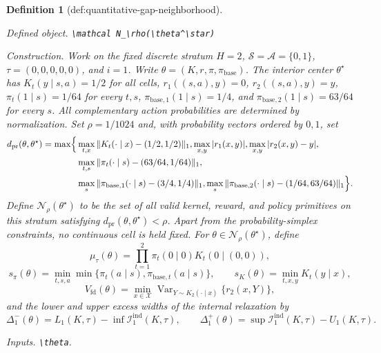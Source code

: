 \documentclass{article}
\newtheorem{definition}{Definition}
\begin{document}
\begin{definition}[def:quantitative-gap-neighborhood]\label{def:quantitative-gap-neighborhood}
\par\smallskip\noindent\emph{Defined object.} \texttt{\textbackslash{}\allowbreak{}mathcal N\_\allowbreak{}\textbackslash{}\allowbreak{}rho(\textbackslash{}\allowbreak{}theta\textasciicircum{}\textbackslash{}\allowbreak{}star)}
\par\smallskip\noindent\emph{Construction.} Work on the fixed discrete stratum \(H=2\), \(\mathcal S=\mathcal A=\{0,1\}\), \(\tau=(0,0,0,0,0)\), and \(i=1\).  Write \(\theta=(K,r,\pi,\pi_{\mathrm{base}})\).  The interior center \(\theta^\star\) has \(K_t(y\mid s,a)=1/2\) for all cells, \(r_1((s,a),y)=0\), \(r_2((s,a),y)=y\), \(\pi_t(1\mid s)=1/64\) for every \(t,s\), \(\pi_{\mathrm{base},1}(1\mid s)=1/4\), and \(\pi_{\mathrm{base},2}(1\mid s)=63/64\) for every \(s\).  All complementary action probabilities are determined by normalization.  Set \(\rho=1/1024\) and, with probability vectors ordered by \(0,1\), set
\[
\begin{aligned}
d_{\mathrm{pr}}(\theta,\theta^\star)=\max\Bigl\{
&\max_{t,x}\|K_t(\cdot\mid x)-(1/2,1/2)\|_1,
 \max_{x,y}|r_1(x,y)|,
 \max_{x,y}|r_2(x,y)-y|,\\
&\max_{t,s}\|\pi_t(\cdot\mid s)-(63/64,1/64)\|_1,\\
&\max_s\|\pi_{\mathrm{base},1}(\cdot\mid s)-(3/4,1/4)\|_1,
 \max_s\|\pi_{\mathrm{base},2}(\cdot\mid s)-(1/64,63/64)\|_1
\Bigr\}.
\end{aligned}
\]
Define \(\mathcal N_\rho(\theta^\star)\) to be the set of all valid kernel, reward, and policy primitives on this stratum satisfying \(d_{\mathrm{pr}}(\theta,\theta^\star)<\rho\).  Apart from the probability-simplex constraints, no continuous cell is held fixed.  For \(\theta\in\mathcal N_\rho(\theta^\star)\), define
\[
 \mu_\tau(\theta)=\prod_{t=1}^2\pi_t(0\mid0)K_t(0\mid(0,0)),
\]
\[
 s_\pi(\theta)=\min_{t,s,a}\min\{\pi_t(a\mid s),\pi_{\mathrm{base},t}(a\mid s)\},
 \qquad
 s_K(\theta)=\min_{t,x,y}K_t(y\mid x),
\]
\[
 V_{\mathrm{fd}}(\theta)=\min_{x\in\mathcal X}
 \operatorname{Var}_{Y\sim K_2(\cdot\mid x)}\{r_2(x,Y)\},
\]
and the lower and upper excess widths of the internal relaxation by
\[
 \Delta_1^-(\theta)=L_1(K,\tau)-\inf\mathcal I_1^{\mathrm{ind}}(K,\tau),
 \qquad
 \Delta_1^+(\theta)=\sup\mathcal I_1^{\mathrm{ind}}(K,\tau)-U_1(K,\tau).
\]
\par\smallskip\noindent\emph{Inputs.} \texttt{\textbackslash{}\allowbreak{}theta}.
\end{definition}
\end{document}
